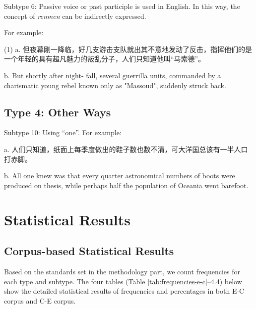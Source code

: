\documentclass[degree=bachelor,language=english]{sysuthesis}
\begin{document}
Subtype 6: Passive voice or past participle is used in English. In this way, the concept of \emph{renmen} can be indirectly expressed.

For example:

(1) a. 但夜幕刚一降临，好几支游击支队就出其不意地发动了反击，指挥他们的是一个年轻的具有超凡魅力的叛乱分子，人们只知道他叫“马索德”。

b. But shortly after night- fall, several guerrilla units, commanded by a charismatic young rebel known only as "Massoud", suddenly struck back.


\subsection{Type 4: Other Ways}

Subtype 10: Using “one”. For example:

a. 人们只知道，纸面上每季度做出的鞋子数也数不清，可大洋国总该有一半人口打赤脚。

b. All one knew was that every quarter astronomical numbers of boots were produced on thesis, while perhaps half the population of Oceania went barefoot.



\section{Statistical Results}

\subsection{Corpus-based Statistical Results}

Based on the standards set in the methodology part, we count frequencies for each type and subtype. The four tables (Table \ref{tab:frequencies-e-c}--4.4) below show the detailed statistical results of frequencies and percentages in both E-C corpus and C-E corpus.
\end{document}
